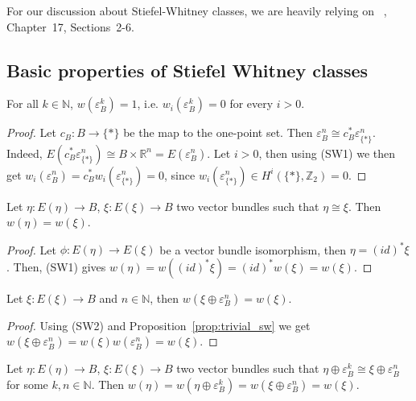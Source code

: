 For our discussion about Stiefel-Whitney classes, we are heavily relying on ~\cite{husemoller}, Chapter~17, Sections~2-6.

\subsection{Basic properties of Stiefel Whitney classes}
\begin{proposition}\label{prop:trivial_sw} For all $k\in\mathbb{N}$, $w(\varepsilon_B^k)=1$, i.e. $w_i(\varepsilon_B^k)=0$ for every $i>0$.
\end{proposition}
\begin{proof} Let $c_B:B\to\{*\}$ be the map to the one-point set. Then $\varepsilon_B^n\cong c_B^*\varepsilon_{\{*\}}^n$. Indeed, $E(c_B^*\varepsilon_{\{*\}}^n)\cong B\times\mathbb{R}^n=E(\varepsilon_B^n)$. Let $i>0$, then using (SW1) we then get $w_i(\varepsilon_B^n)=c_B^*w_i(\varepsilon_{\{*\}}^n)=0$, since $w_i(\varepsilon_{\{*\}}^n)\in H^i(\{*\},\mathbb{Z}_2)=0$.
\end{proof}

\begin{proposition} Let $\eta:E(\eta)\to B$, $\xi:E(\xi)\to B$ two vector bundles such that $\eta\cong\xi$. Then $w(\eta)=w(\xi)$.
\end{proposition}
\begin{proof} Let $\phi:E(\eta)\to E(\xi)$ be a vector bundle isomorphism, then $\eta=(id)^*\xi$. Then, (SW1) gives $w(\eta)=w((id)^*\xi)=(id)^*w(\xi)=w(\xi)$.
\end{proof}

\begin{proposition} Let $\xi:E(\xi)\to B$ and $n\in\mathbb{N}$, then $w(\xi\oplus\varepsilon_B^n)=w(\xi)$.
\end{proposition}
\begin{proof} Using (SW2) and Proposition~\ref{prop:trivial_sw} we get $w(\xi\oplus\varepsilon_B^n)=w(\xi)w(\varepsilon_B^n)=w(\xi)$.
\end{proof}

\begin{corollary} Let $\eta:E(\eta)\to B$, $\xi:E(\xi)\to B$ two vector bundles such that $\eta\oplus\varepsilon_B^k\cong\xi\oplus\varepsilon_B^n$ for some $k,n\in\mathbb{N}$. Then $w(\eta)=w(\eta\oplus\varepsilon_B^k)=w(\xi\oplus\varepsilon_B^n)=w(\xi)$.
\end{corollary}

